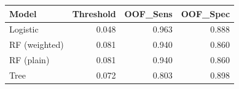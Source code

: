 
\begin{tabular}{lrrr}
\toprule
Model & Threshold & OOF\_Sens & OOF\_Spec\\
\midrule
Logistic & 0.048 & 0.963 & 0.888\\
RF (weighted) & 0.081 & 0.940 & 0.860\\
RF (plain) & 0.081 & 0.940 & 0.860\\
Tree & 0.072 & 0.803 & 0.898\\
\bottomrule
\end{tabular}
